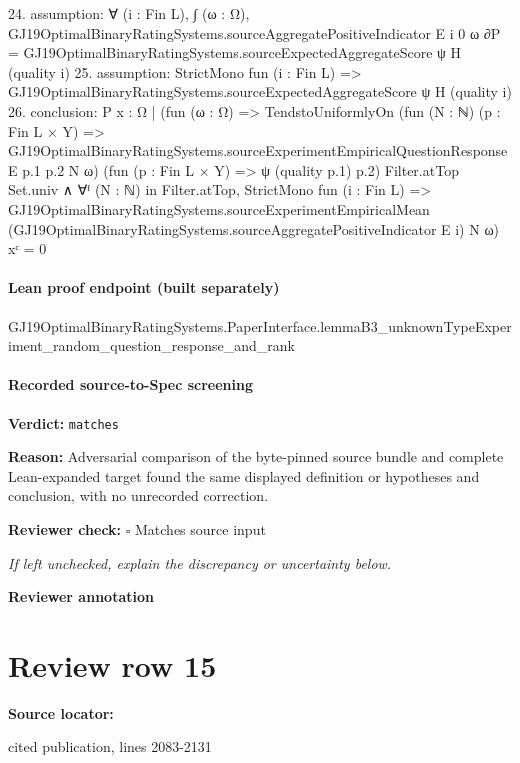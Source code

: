 \documentclass[10pt]{article}
\newcommand{\reviewerbox}{%
  \par\noindent\fbox{\parbox{0.96\linewidth}{\rule{0pt}{0.38in}}}\par
}
\newcommand{\reviewmatch}[1]{%
  \par\noindent\textbf{Reviewer check:} $\square$\; #1\par
  \noindent\emph{If left unchecked, explain the discrepancy or uncertainty below.}\par
}
\begin{document}
\begin{ReviewVerbatim}
24. assumption: ∀ (i : Fin L),
  ∫ (ω : Ω), GJ19OptimalBinaryRatingSystems.sourceAggregatePositiveIndicator E i 0 ω ∂P =
    GJ19OptimalBinaryRatingSystems.sourceExpectedAggregateScore ψ H (quality i)
25. assumption: StrictMono fun (i : Fin L) => GJ19OptimalBinaryRatingSystems.sourceExpectedAggregateScore ψ H (quality i)
26. conclusion: P
    {x : Ω |
        (fun (ω : Ω) =>
            TendstoUniformlyOn
                (fun (N : ℕ) (p : Fin L × Y) =>
                  GJ19OptimalBinaryRatingSystems.sourceExperimentEmpiricalQuestionResponse E p.1 p.2 N ω)
                (fun (p : Fin L × Y) => ψ (quality p.1) p.2) Filter.atTop Set.univ ∧
              ∀ᶠ (N : ℕ) in Filter.atTop,
                StrictMono fun (i : Fin L) =>
                  GJ19OptimalBinaryRatingSystems.sourceExperimentEmpiricalMean
                    (GJ19OptimalBinaryRatingSystems.sourceAggregatePositiveIndicator E i) N ω)
          x}ᶜ =
  0
\end{ReviewVerbatim}

\paragraph{Lean proof endpoint (built separately)}\begin{ReviewVerbatim}
GJ19OptimalBinaryRatingSystems.PaperInterface.lemmaB3_unknownTypeExperiment_random_question_response_and_rank
\end{ReviewVerbatim}

\paragraph{Recorded source-to-Spec screening}
\textbf{Verdict:} \texttt{matches}
\\
{\raggedright
\textbf{Reason:} Adversarial comparison of the byte-\allowbreak{}pinned source bundle and complete Lean-\allowbreak{}expanded target found the same displayed definition or hypotheses and conclusion, with no unrecorded correction.\allowbreak{}
\par}
\reviewmatch{Matches source input}
\noindent\textbf{Reviewer annotation}\par
\reviewerbox
\clearpage
\hypertarget{source-claim-7ea3c8ab498f92dc}{}
\section*{Review row 15}
\textbf{Source locator:} {\footnotesize\raggedright cited publication, lines 2083-\allowbreak{}2131\par}
\end{document}
